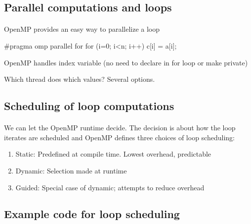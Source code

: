 \documentclass[%
oneside,                 %
final,                   %
10pt]{article}
\begin{document}
\noindent



\subsection{Parallel computations and loops}


\paragraph{}
OpenMP provides an easy way to parallelize a loop



\bcppcod
#pragma omp parallel for
  for (i=0; i<n; i++) c[i] = a[i];

\ecppcod

OpenMP handles index variable (no need to declare in for loop or make private)

Which thread does which values?  Several options.



\subsection{Scheduling of  loop computations}


\paragraph{}
We can let  the OpenMP runtime decide. The decision is about how the loop iterates are scheduled
and  OpenMP defines three choices of loop scheduling:
\begin{enumerate}
\item Static: Predefined at compile time. Lowest overhead, predictable

\item Dynamic: Selection made at runtime 

\item Guided: Special case of dynamic; attempts to reduce overhead
\end{enumerate}

\noindent



\subsection{Example code for loop scheduling}
\end{document}
